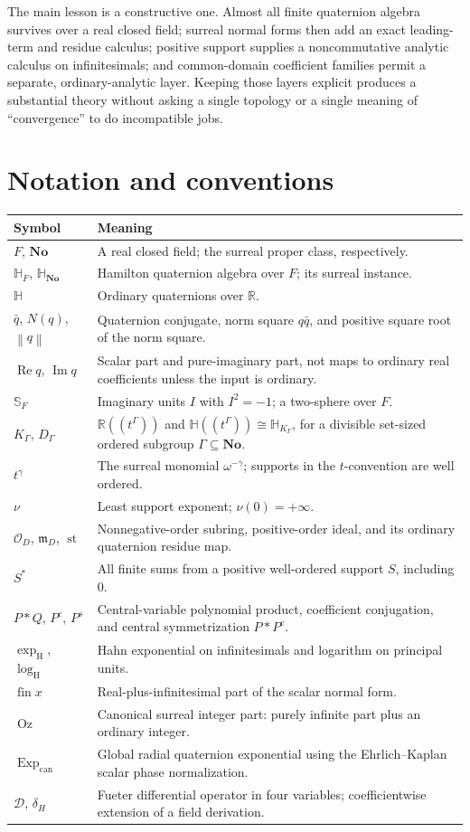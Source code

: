 \documentclass[11pt,letterpaper]{article}
\theoremstyle{definition}
\newcommand{\No}{\mathbf{No}}
\newcommand{\R}{\mathbb R}
\newcommand{\HH}{\mathbb H}
\newcommand{\SQ}{\mathbb H_{\No}}
\newcommand{\HF}{\mathbb H_F}
\newcommand{\DG}{D_\Gamma}
\newcommand{\KG}{K_\Gamma}
\newcommand{\OO}{\mathcal O}
\newcommand{\mm}{\mathfrak m}
\newcommand{\Ss}{\mathbb S_F}
\newcommand{\val}{\nu}
\newcommand{\norm}[1]{\left\lVert#1\right\rVert}
\DeclareMathOperator{\Rea}{Re}
\DeclareMathOperator{\Imag}{Im}
\DeclareMathOperator{\st}{st}
\DeclareMathOperator{\fin}{fin}
\DeclareMathOperator{\Oz}{Oz}
\newcommand{\ExpC}{\operatorname{Exp}_{\mathrm{can}}}
\newcommand{\exph}{\operatorname{exp}_{\mathrm H}}
\newcommand{\logh}{\operatorname{log}_{\mathrm H}}
\begin{document}
The main lesson is a constructive one. Almost all finite quaternion algebra
survives over a real closed field; surreal normal forms then add an exact
leading-term and residue calculus; positive support supplies a noncommutative
analytic calculus on infinitesimals; and common-domain coefficient families
permit a separate, ordinary-analytic layer. Keeping those layers explicit
produces a substantial theory without asking a single topology or a single
meaning of ``convergence'' to do incompatible jobs.

\appendix
\section{Notation and conventions}
\begin{longtable}{@{}p{}p{}@{}}
\toprule
Symbol & Meaning\\
\midrule
\endhead
$F$, $\No$ & A real closed field; the surreal proper class, respectively.\\
$\HF$, $\SQ$ & Hamilton quaternion algebra over $F$; its surreal instance.\\
$\HH$ & Ordinary quaternions over $\R$.\\
$\bar q$, $N(q)$, $\norm q$ & Quaternion conjugate, norm square $q\bar q$,
and positive square root of the norm square.\\
$\Rea q$, $\Imag q$ & Scalar part and pure-imaginary part, not maps to
ordinary real coefficients unless the input is ordinary.\\
$\Ss$ & Imaginary units $I$ with $I^2=-1$; a two-sphere over $F$.\\
$\KG$, $\DG$ & $\R((t^\Gamma))$ and $\HH((t^\Gamma))\cong\HH_{\KG}$,
for a divisible set-sized ordered subgroup $\Gamma\subseteq\No$.\\
$t^\gamma$ & The surreal monomial $\omega^{-\gamma}$; supports in the
$t$-convention are well ordered.\\
$\val$ & Least support exponent; $\val(0)=+\infty$.\\
$\OO_D$, $\mm_D$, $\st$ & Nonnegative-order subring, positive-order ideal,
and its ordinary quaternion residue map.\\
$S^*$ & All finite sums from a positive well-ordered support $S$, including $0$.\\
$P*Q$, $P^c$, $P^s$ & Central-variable polynomial product, coefficient
conjugation, and central symmetrization $P*P^c$.\\
$\exph$, $\logh$ & Hahn exponential on infinitesimals and logarithm on
principal units.\\
$\fin x$ & Real-plus-infinitesimal part of the scalar normal form.\\
$\Oz$ & Canonical surreal integer part: purely infinite part plus an ordinary
integer.\\
$\ExpC$ & Global radial quaternion exponential using the Ehrlich--Kaplan
scalar phase normalization.\\
$\mathcal D$, $\delta_H$ & Fueter differential operator in four variables;
coefficientwise extension of a field derivation.\\
\bottomrule
\end{longtable}
\end{document}
